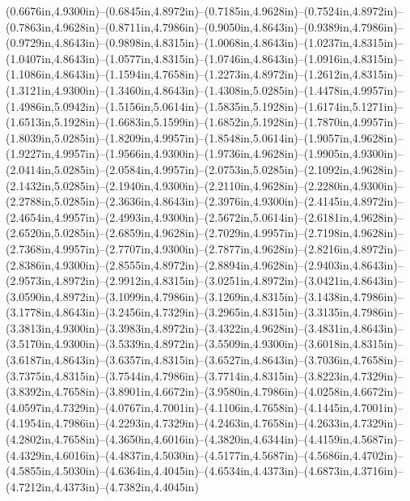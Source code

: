 (0.6676in,4.9300in)--(0.6845in,4.8972in)--(0.7185in,4.9628in)--(0.7524in,4.8972in)--(0.7863in,4.9628in)--(0.8711in,4.7986in)--(0.9050in,4.8643in)--(0.9389in,4.7986in)--(0.9729in,4.8643in)--(0.9898in,4.8315in)--(1.0068in,4.8643in)--(1.0237in,4.8315in)--(1.0407in,4.8643in)--(1.0577in,4.8315in)--(1.0746in,4.8643in)--(1.0916in,4.8315in)--(1.1086in,4.8643in)--(1.1594in,4.7658in)--(1.2273in,4.8972in)--(1.2612in,4.8315in)--(1.3121in,4.9300in)--(1.3460in,4.8643in)--(1.4308in,5.0285in)--(1.4478in,4.9957in)--(1.4986in,5.0942in)--(1.5156in,5.0614in)--(1.5835in,5.1928in)--(1.6174in,5.1271in)--(1.6513in,5.1928in)--(1.6683in,5.1599in)--(1.6852in,5.1928in)--(1.7870in,4.9957in)--(1.8039in,5.0285in)--(1.8209in,4.9957in)--(1.8548in,5.0614in)--(1.9057in,4.9628in)--(1.9227in,4.9957in)--(1.9566in,4.9300in)--(1.9736in,4.9628in)--(1.9905in,4.9300in)--(2.0414in,5.0285in)--(2.0584in,4.9957in)--(2.0753in,5.0285in)--(2.1092in,4.9628in)--(2.1432in,5.0285in)--(2.1940in,4.9300in)--(2.2110in,4.9628in)--(2.2280in,4.9300in)--(2.2788in,5.0285in)--(2.3636in,4.8643in)--(2.3976in,4.9300in)--(2.4145in,4.8972in)--(2.4654in,4.9957in)--(2.4993in,4.9300in)--(2.5672in,5.0614in)--(2.6181in,4.9628in)--(2.6520in,5.0285in)--(2.6859in,4.9628in)--(2.7029in,4.9957in)--(2.7198in,4.9628in)--(2.7368in,4.9957in)--(2.7707in,4.9300in)--(2.7877in,4.9628in)--(2.8216in,4.8972in)--(2.8386in,4.9300in)--(2.8555in,4.8972in)--(2.8894in,4.9628in)--(2.9403in,4.8643in)--(2.9573in,4.8972in)--(2.9912in,4.8315in)--(3.0251in,4.8972in)--(3.0421in,4.8643in)--(3.0590in,4.8972in)--(3.1099in,4.7986in)--(3.1269in,4.8315in)--(3.1438in,4.7986in)--(3.1778in,4.8643in)--(3.2456in,4.7329in)--(3.2965in,4.8315in)--(3.3135in,4.7986in)--(3.3813in,4.9300in)--(3.3983in,4.8972in)--(3.4322in,4.9628in)--(3.4831in,4.8643in)--(3.5170in,4.9300in)--(3.5339in,4.8972in)--(3.5509in,4.9300in)--(3.6018in,4.8315in)--(3.6187in,4.8643in)--(3.6357in,4.8315in)--(3.6527in,4.8643in)--(3.7036in,4.7658in)--(3.7375in,4.8315in)--(3.7544in,4.7986in)--(3.7714in,4.8315in)--(3.8223in,4.7329in)--(3.8392in,4.7658in)--(3.8901in,4.6672in)--(3.9580in,4.7986in)--(4.0258in,4.6672in)--(4.0597in,4.7329in)--(4.0767in,4.7001in)--(4.1106in,4.7658in)--(4.1445in,4.7001in)--(4.1954in,4.7986in)--(4.2293in,4.7329in)--(4.2463in,4.7658in)--(4.2633in,4.7329in)--(4.2802in,4.7658in)--(4.3650in,4.6016in)--(4.3820in,4.6344in)--(4.4159in,4.5687in)--(4.4329in,4.6016in)--(4.4837in,4.5030in)--(4.5177in,4.5687in)--(4.5686in,4.4702in)--(4.5855in,4.5030in)--(4.6364in,4.4045in)--(4.6534in,4.4373in)--(4.6873in,4.3716in)--(4.7212in,4.4373in)--(4.7382in,4.4045in)
